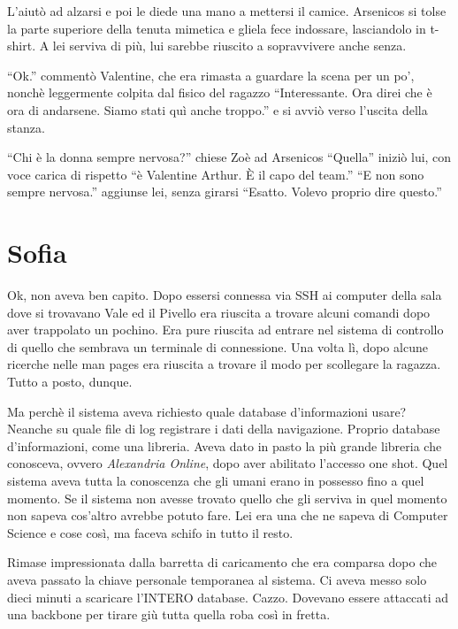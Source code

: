     L'aiutò ad alzarsi e poi le diede una mano a mettersi il camice. Arsenicos si tolse la parte superiore della tenuta
    mimetica e gliela fece indossare, lasciandolo in t-shirt. A lei serviva di più, lui sarebbe riuscito a sopravvivere
    anche senza.

    ``Ok.'' commentò Valentine, che era rimasta a guardare la scena per un po', nonchè leggermente colpita dal fisico
    del ragazzo ``Interessante. Ora direi che è ora di andarsene. Siamo stati quì anche troppo.'' e si avviò verso
    l'uscita della stanza.

    ``Chi è la donna sempre nervosa?'' chiese Zoè ad Arsenicos ``Quella'' iniziò lui, con voce carica di rispetto ``è
    Valentine Arthur. È il capo del team.'' ``E non sono sempre nervosa.'' aggiunse lei, senza girarsi ``Esatto. Volevo
    proprio dire questo.''

  \section*{Sofia}

    Ok, non aveva ben capito. Dopo essersi connessa via SSH ai computer della sala dove si trovavano Vale ed il Pivello
    era riuscita a trovare alcuni comandi dopo aver trappolato un pochino. Era pure riuscita ad entrare nel sistema di
    controllo di quello che sembrava un terminale di connessione. Una volta lì, dopo alcune ricerche nelle man pages era
    riuscita a trovare il modo per scollegare la ragazza. Tutto a posto, dunque.

    Ma perchè il sistema aveva richiesto quale database d'informazioni usare? Neanche su quale file di log registrare i
    dati della navigazione. Proprio database d'informazioni, come una libreria. Aveva dato in pasto la più grande
    libreria che conosceva, ovvero \emph{Alexandria Online}, dopo aver abilitato l'accesso one shot. Quel sistema aveva
    tutta la conoscenza che gli umani erano in possesso fino a quel momento. Se il sistema non avesse trovato quello che
    gli serviva in quel momento non sapeva cos'altro avrebbe potuto fare. Lei era una che ne sapeva di Computer Science
    e cose così, ma faceva schifo in tutto il resto.

    Rimase impressionata dalla barretta di caricamento che era comparsa dopo che aveva passato la chiave personale
    temporanea al sistema. Ci aveva messo solo dieci minuti a scaricare l'INTERO database. Cazzo. Dovevano essere
    attaccati ad una backbone per tirare giù tutta quella roba così in fretta.


